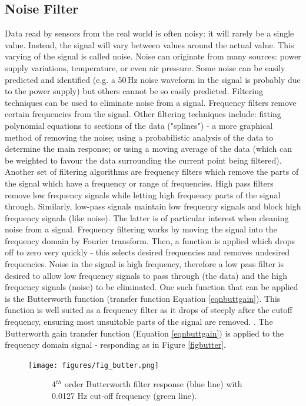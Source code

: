 \documentclass[twoside,a4]{report}
\def\br{\newline \newline \noindent}
\begin{document}
	\subsection*{Noise Filter}
	Data read by sensors from the real world is often noisy: it will rarely be a single value. Instead, the signal will vary between values around the actual value. This varying of the signal is called noise. Noise can originate from many sources: power supply variations, temperature, or even air pressure. Some noise can be easily predicted and identified (e.g. a 50\,Hz noise waveform in the signal is probably due to the power supply) but others cannot be so easily predicted. 
	\br
	Filtering techniques can be used to eliminate noise from a signal. Frequency filters remove certain frequencies from the signal. Other filtering techniques include: fitting polynomial equations to sections of the data ("splines") - a more graphical method of removing the noise; using a probabilistic analysis of the data to determine the main response; or using a moving average of the data (which can be weighted to favour the data surrounding the current point being filtered).
	\br
	Another set of filtering algorithms are frequency filters which remove the parts of the signal which have a frequency or range of frequencies. High pass filters remove low frequency signals while letting high frequency parts of the signal through. Similarly, low-pass signals maintain low frequency signals and block high frequency signals (like noise). The latter is of particular interest when cleaning noise from a signal. Frequency filtering works by moving the signal into the frequency domain by Fourier transform. Then, a function is applied which drops off to zero very quickly - this selects desired frequencies and removes undesired frequencies. Noise in the signal is high frequency, therefore a low pass filter is desired to allow low frequency signals to pass through (the data) and the high frequency signals (noise) to be eliminated. One such function that can be applied is the Butterworth function (transfer function Equation \ref{eqnbuttgain}). This function is well suited as a frequency filter as it drops of steeply after the cutoff frequency, ensuring most unsuitable parts of the signal are removed. \cite{backsignalbutter}. The Butterworth gain transfer function (Equation \ref{eqnbuttgain}) is applied to the frequency domain signal - responding as in Figure \ref{figbutter}.
	
	\begin{figure}[!htb]
		\centering
		\texttt{[image: figures/fig\_butter.png]}
		\caption{Frequency Domain Signal Response To Butterworth Function}
		\label{figbutter}
		\begin{subfigure}{0.8\textwidth}
			\centering
			{\footnotesize 4$^{th}$ order Butterworth filter response (blue line) with 0.0127 Hz cut-off frequency (green line).}
		\end{subfigure}
	\end{figure}
	
\end{document}
